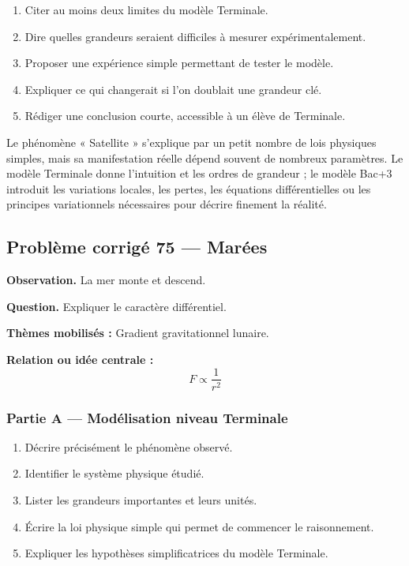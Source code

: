 \documentclass[11pt,a4paper]{article}
\begin{document}
\begin{enumerate}
  \item Citer au moins deux limites du modèle Terminale.
  \item Dire quelles grandeurs seraient difficiles à mesurer expérimentalement.
  \item Proposer une expérience simple permettant de tester le modèle.
  \item Expliquer ce qui changerait si l'on doublait une grandeur clé.
  \item Rédiger une conclusion courte, accessible à un élève de Terminale.
\end{enumerate}

\begin{corrigebox}
Le phénomène « Satellite » s'explique par un petit nombre de lois physiques simples, mais sa manifestation réelle dépend souvent de nombreux paramètres. Le modèle Terminale donne l'intuition et les ordres de grandeur ; le modèle Bac+3 introduit les variations locales, les pertes, les équations différentielles ou les principes variationnels nécessaires pour décrire finement la réalité.
\end{corrigebox}

\subsection{Problème corrigé 75 — Marées}

\begin{exercicebox}
\textbf{Observation.} La mer monte et descend.

\medskip
\textbf{Question.} Expliquer le caractère différentiel.

\medskip
\textbf{Thèmes mobilisés :} Gradient gravitationnel lunaire.

\medskip
\textbf{Relation ou idée centrale :}
\[
F\propto\frac1{r^2}
\]
\end{exercicebox}

\subsubsection*{Partie A — Modélisation niveau Terminale}

\begin{enumerate}
  \item Décrire précisément le phénomène observé.
  \item Identifier le système physique étudié.
  \item Lister les grandeurs importantes et leurs unités.
  \item Écrire la loi physique simple qui permet de commencer le raisonnement.
  \item Expliquer les hypothèses simplificatrices du modèle Terminale.
\end{enumerate}
\end{document}
